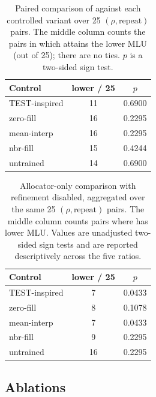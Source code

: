 \begin{table}[t]
    \caption{Paired comparison of \sysname{} against each controlled variant
    over 25 $(\rho,\text{repeat})$ pairs. The middle column counts the pairs in
    which \sysname{} attains the lower MLU (out of 25); there are no ties.
    $p$ is a two-sided sign test.}
    \label{tab:paired}
    \centering
    \footnotesize
    \setlength{\tabcolsep}{4pt}
    \begin{tabular}{@{}lcc@{}}
        \toprule
        Control & \sysname{} lower / 25 & $p$ \\
        \midrule
        TEST-inspired & 11 & 0.6900 \\
        zero-fill & 16 & 0.2295 \\
        mean-interp & 16 & 0.2295 \\
        nbr-fill & 15 & 0.4244 \\
        untrained & 14 & 0.6900 \\
        \bottomrule
    \end{tabular}
\end{table}

\begin{table}[t]
    \caption{Allocator-only comparison with refinement disabled, aggregated
    over the same 25 $(\rho,\text{repeat})$ pairs. The middle column counts
    pairs where \sysname{} has lower MLU. Values are unadjusted two-sided
    sign tests and are reported descriptively across the five ratios.}
    \label{tab:no-repair-paired}
    \centering
    \footnotesize
    \setlength{\tabcolsep}{4pt}
    \begin{tabular}{@{}lcc@{}}
        \toprule
        Control & \sysname{} lower / 25 & $p$ \\
        \midrule
        TEST-inspired & 7 & 0.0433 \\
        zero-fill & 8 & 0.1078 \\
        mean-interp & 7 & 0.0433 \\
        nbr-fill & 9 & 0.2295 \\
        untrained & 16 & 0.2295 \\
        \bottomrule
    \end{tabular}
\end{table}

\subsection{Ablations}
\label{sec:allocator-isolation}

